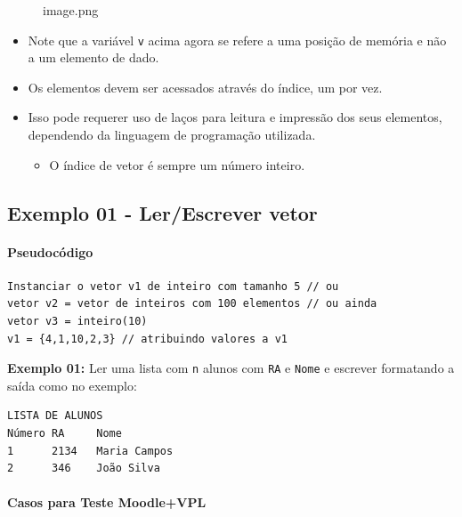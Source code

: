 \documentclass[12pt,a4paper]{article}
\providecommand{\tightlist}{%
      \setlength{\itemsep}{0pt}\setlength{\parskip}{0pt}}
\begin{document}
    \begin{figure}
\centering
\caption{image.png}
\end{figure}

    \begin{itemize}
\tightlist
\item
  Note que a variável \texttt{v} acima agora se refere a uma posição de
  memória e não a um elemento de dado.
\item
  Os elementos devem ser acessados através do índice, um por vez.
\item
  Isso pode requerer uso de laços para leitura e impressão dos seus
  elementos, dependendo da linguagem de programação utilizada.

  \begin{itemize}
  \tightlist
  \item
    O índice de vetor é sempre um número inteiro.
  \end{itemize}
\end{itemize}

    \hypertarget{exemplo-01---lerescrever-vetor}{%
\subsection{Exemplo 01 - Ler/Escrever
vetor}\label{exemplo-01---lerescrever-vetor}}

    \hypertarget{pseudocuxf3digo}{%
\paragraph{Pseudocódigo}\label{pseudocuxf3digo}}

    \begin{verbatim}
Instanciar o vetor v1 de inteiro com tamanho 5 // ou
vetor v2 = vetor de inteiros com 100 elementos // ou ainda
vetor v3 = inteiro(10)
v1 = {4,1,10,2,3} // atribuindo valores a v1
\end{verbatim}

    \textbf{Exemplo 01:} Ler uma lista com \texttt{n} alunos com \texttt{RA}
e \texttt{Nome} e escrever formatando a saída como no exemplo:

    \begin{verbatim}
LISTA DE ALUNOS
Número RA     Nome
1      2134   Maria Campos
2      346    João Silva
\end{verbatim}

    \hypertarget{casos-para-teste-moodlevpl}{%
\paragraph{Casos para Teste
Moodle+VPL}\label{casos-para-teste-moodlevpl}}
\end{document}
